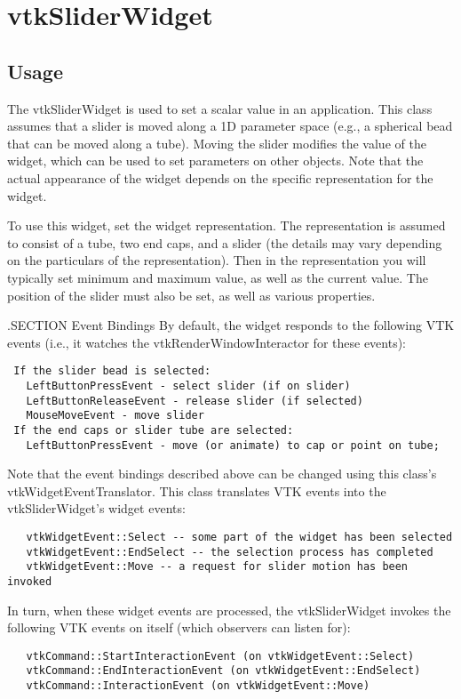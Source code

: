 \section{vtkSliderWidget}

\subsection{Usage}

 The vtkSliderWidget is used to set a scalar value in an application.  This
 class assumes that a slider is moved along a 1D parameter space (e.g., a
 spherical bead that can be moved along a tube).  Moving the slider
 modifies the value of the widget, which can be used to set parameters on
 other objects. Note that the actual appearance of the widget depends on
 the specific representation for the widget.
 
 To use this widget, set the widget representation. The representation is
 assumed to consist of a tube, two end caps, and a slider (the details may
 vary depending on the particulars of the representation). Then in the
 representation you will typically set minimum and maximum value, as well
 as the current value. The position of the slider must also be set, as well
 as various properties.

 .SECTION Event Bindings
 By default, the widget responds to the following VTK events (i.e., it
 watches the vtkRenderWindowInteractor for these events):
 \begin{verbatim}
 If the slider bead is selected:
   LeftButtonPressEvent - select slider (if on slider)
   LeftButtonReleaseEvent - release slider (if selected)
   MouseMoveEvent - move slider
 If the end caps or slider tube are selected:
   LeftButtonPressEvent - move (or animate) to cap or point on tube;
 \end{verbatim}

 Note that the event bindings described above can be changed using this
 class's vtkWidgetEventTranslator. This class translates VTK events 
 into the vtkSliderWidget's widget events:
 \begin{verbatim}
   vtkWidgetEvent::Select -- some part of the widget has been selected
   vtkWidgetEvent::EndSelect -- the selection process has completed
   vtkWidgetEvent::Move -- a request for slider motion has been invoked
 \end{verbatim}

 In turn, when these widget events are processed, the vtkSliderWidget
 invokes the following VTK events on itself (which observers can listen for):
 \begin{verbatim}
   vtkCommand::StartInteractionEvent (on vtkWidgetEvent::Select)
   vtkCommand::EndInteractionEvent (on vtkWidgetEvent::EndSelect)
   vtkCommand::InteractionEvent (on vtkWidgetEvent::Move)
 \end{verbatim}


